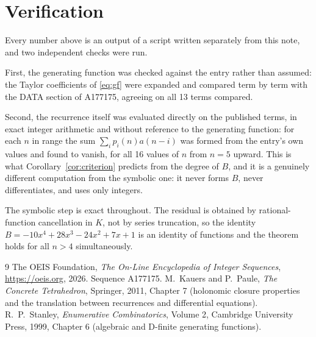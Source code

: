 \documentclass[11pt,a4paper]{article}
\theoremstyle{plain}
\theoremstyle{definition}
\begin{document}
\section{Verification}

Every number above is an output of a script written separately from this note, and two
independent checks were run.

First, the generating function was checked against the entry rather than assumed: the
Taylor coefficients of \eqref{eq:gf} were expanded and compared term by term with the DATA
section of A177175, agreeing on all 13 terms compared.

Second, the recurrence itself was evaluated directly on the published terms, in exact
integer arithmetic and without reference to the generating function: for each $n$ in range
the sum $\sum_{i}p_{i}(n)a(n-i)$ was formed from the entry's own values and found to
vanish, for all 16 values of $n$ from $n=5$ upward. This is what
Corollary~\ref{cor:criterion} predicts from the degree of $B$, and it is a genuinely
different computation from the symbolic one: it never forms $B$, never differentiates, and
uses only integers.

The symbolic step is exact throughout. The residual is obtained by rational-function
cancellation in $K$, not by series truncation, so the identity $B=- 10 x^{4} + 28 x^{3} - 24 x^{2} + 7 x + 1$ is an
identity of functions and the theorem holds for all $n>4$ simultaneously.

\begin{thebibliography}{9}
 The OEIS Foundation, \emph{The On-Line Encyclopedia of Integer Sequences},
\url{https://oeis.org}, 2026. Sequence A177175.
 M.~Kauers and P.~Paule, \emph{The Concrete Tetrahedron}, Springer, 2011,
Chapter 7 (holonomic closure properties and the translation between recurrences and
differential equations).
 R.~P.~Stanley, \emph{Enumerative Combinatorics}, Volume 2, Cambridge
University Press, 1999, Chapter 6 (algebraic and D-finite generating functions).
\end{thebibliography}
\end{document}
